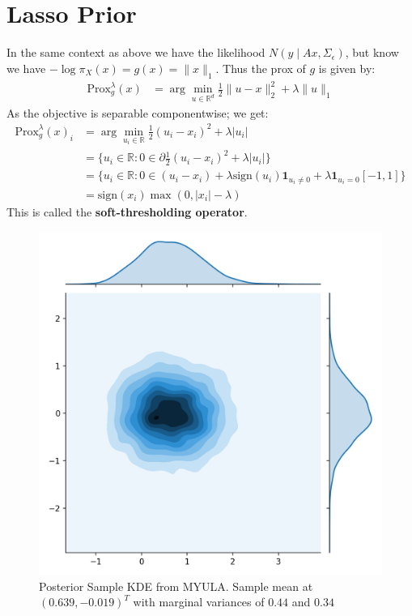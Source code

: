 \documentclass[a4paper,10pt]{article}
\newcommand{\RR}{\mathbb{R}}
\numberwithin{equation}{section}
\numberwithin{thm}{section}
\begin{document}
\newpage
\section{Lasso Prior}

In the same context as above we have the likelihood $N( y \mid A x, \Sigma_\epsilon)$, but know we have $- \log \pi_X (x) = g(x) = \| x \|_1$. Thus the prox of $g$ is given by:
\begin{align}
 \text{Prox}_g^\lambda (x) &= \arg \min_{u \in \RR^d} \tfrac{1}{2} \| u - x \|_2^2 + \lambda \|u \|_1
\end{align}
As the objective is separable componentwise; we get:
\begin{align}
 \text{Prox}_g^\lambda (x)_i &= \arg \min_{u_i \in \RR} \tfrac{1}{2} ( u_i - x_i )^2 + \lambda |u_i| \\
 	&= \{ u_i \in \RR : 0 \in \partial  \tfrac{1}{2} ( u_i - x_i )^2 + \lambda |u_i| \} \\
 	&= \{ u_i \in \RR : 0 \in (u_i - x_i) + \lambda \text{sign}(u_i) \mathbf{1}_{u_i \neq 0} + \lambda \mathbf{1}_{u_i = 0} [-1,1] \} \\
 	&= \text{sign}(x_i) \max(0, |x_i| - \lambda)
\end{align}
This is called the \textbf{soft-thresholding operator}. 

\begin{figure}[h]
\label{fig:lasso_eg}
\centering
\includegraphics[scale=0.6]{figs/lasso_eg_samples.png}	
\caption{Posterior Sample KDE from MYULA. Sample mean at $(0.639, -0.019)^T$ with marginal variances of $0.44$ and $0.34$} 
\end{figure}
\end{document}
